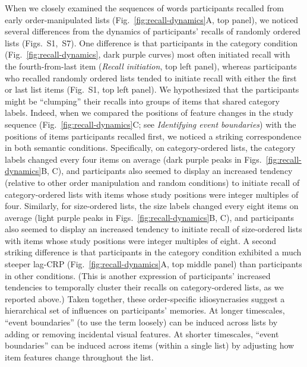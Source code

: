 \documentclass[11pt]{article}
\newcommand{\dynamicsRandom}{S1}
\newcommand{\recallInit}{S7}
\newcommand{\abbreviations}{S1}
\begin{document}
When we closely examined the sequences of words participants recalled from
early order-manipulated lists (Fig.~\ref{fig:recall-dynamics}A, top panel), we
noticed several differences from the dynamics of participants' recalls of
randomly ordered lists (Figs.~\dynamicsRandom,~\recallInit). One difference is
that participants in the category condition (Fig.~\ref{fig:recall-dynamics},
dark purple curves) most often initiated recall with the
fourth-from-last item (\textit{Recall initiation}, top left panel), whereas
participants who recalled randomly ordered lists tended to initiate recall with
either the first or last list items (Fig.~\dynamicsRandom, top left panel). We
hypothesized that the participants might be ``clumping'' their recalls into
groups of items that shared category labels. Indeed, when we compared the
positions of feature changes in the study sequence
(Fig.~\ref{fig:recall-dynamics}C; see \textit{Identifying event boundaries})
with the positions of items participants recalled first, we noticed a striking
correspondence in both semantic conditions. Specifically, on category-ordered
lists, the category labels changed every four items on average (dark purple
peaks in Figs.~\ref{fig:recall-dynamics}B, C), and participants also seemed to
display an increased tendency (relative to other order manipulation and random
conditions) to initiate recall of category-ordered lists with items whose study
positions were integer multiples of four. Similarly, for size-ordered lists,
the size labels changed every eight items on average (light purple peaks in
Figs.~\ref{fig:recall-dynamics}B, C), and participants also seemed to display an
increased tendency to initiate recall of size-ordered lists with items whose
study positions were integer multiples of eight. A second striking difference
is that participants in the category condition exhibited a much steeper lag-CRP
(Fig.~\ref{fig:recall-dynamics}A, top middle panel) than participants in other
conditions. (This is another expression of participants' increased tendencies
to temporally cluster their recalls on category-ordered lists, as we reported
above.) Taken together, these order-specific idiosyncrasies suggest a
hierarchical set of influences on participants' memories. At longer timescales,
``event boundaries'' (to use the term loosely) can be induced across lists by
adding or removing incidental visual features. At shorter timescales, ``event
boundaries'' can be induced across items (within a single list) by adjusting
how item features change throughout the list.

\begin{table}[tp]
\centering
\tiny

    
\caption{\textbf{Comparing accuracy on early lists in different order manipulation
conditions.} The $t$-tests reported in the table were
carried out across-participants, and reflect data aggregated across all early lists
from each participant. Abbreviations used in this table are defined in
Table~\abbreviations.}

\label{tab:order-accuracy-comparisons-early}
\end{table}
\end{document}
